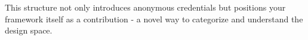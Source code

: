 This structure not only introduces anonymous credentials but positions your framework itself as a contribution - a novel way to categorize and understand the design space.




































































